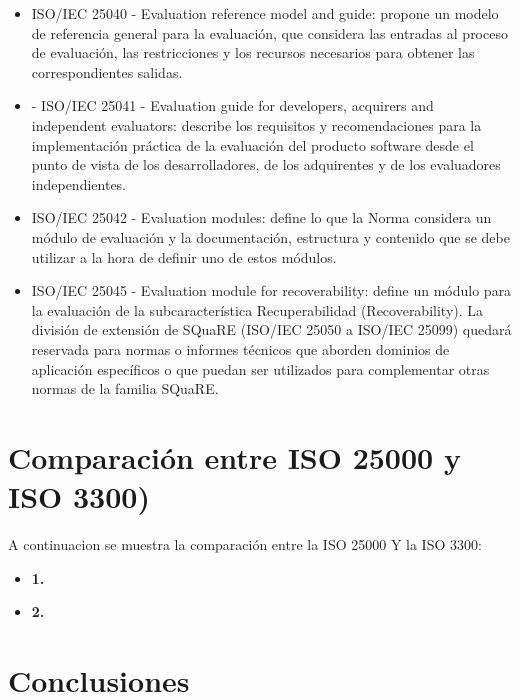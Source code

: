 \documentclass[preprint,12pt]{elsarticle}
\begin{document}
\begin{itemize}
		\begin{itemize}
			\item ISO/IEC 25040 - Evaluation reference model and guide: propone un modelo de referencia general para la evaluación, que considera las entradas al proceso de evaluación, las restricciones y los recursos necesarios para obtener las correspondientes salidas.
			\item - ISO/IEC 25041 - Evaluation guide for developers, acquirers and independent evaluators: describe los requisitos y recomendaciones para la implementación práctica de la evaluación del producto software desde el punto de vista de los desarrolladores, de los adquirentes y de los evaluadores independientes.
			\item ISO/IEC 25042 - Evaluation modules: define lo que la Norma considera un módulo de evaluación y la documentación, estructura y contenido que se debe utilizar a la hora de definir uno de estos módulos.
			\item ISO/IEC 25045 - Evaluation module for recoverability: define un módulo para la evaluación de la subcaracterística Recuperabilidad (Recoverability). La división de extensión de SQuaRE (ISO/IEC 25050 a ISO/IEC 25099) quedará reservada para normas o informes técnicos que aborden dominios de aplicación específicos o que puedan ser utilizados para complementar otras normas de la familia SQuaRE.
		\end{itemize}

		


	\end{itemize}


\section{Comparación entre ISO 25000 y ISO 3300)}
A continuacion se muestra la comparación entre la ISO 25000 Y la ISO 3300:
	
	\begin{itemize}

	\item{\textbf{1.}} 
	\item{\textbf{2.}} 
\end{itemize}


\section{Conclusiones}


	\newpage
	
		
\end{document}
